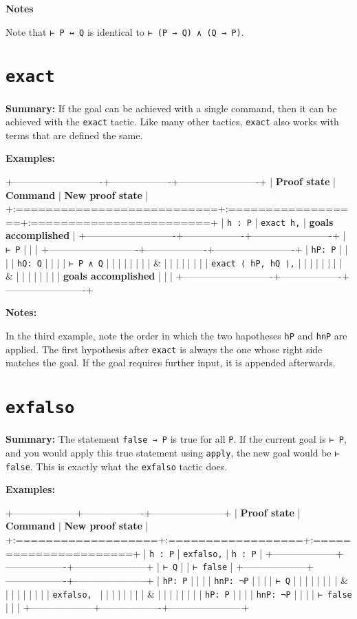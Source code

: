 \documentclass{memoir}
\begin{document}
\textbf{Notes}

Note that \Verb|⊢ P ↔ Q| is identical to \Verb|⊢ (P → Q) ∧ (Q → P)|.




\section{\Verb|exact|}

\textbf{Summary:} If the goal can be achieved with a single command, then it can be achieved with the \Verb|exact| tactic. Like many other tactics, \Verb|exact| also works with terms that are defined the same.

\textbf{Examples:}

+----------------------------+-------------------+-------------------------+
| \textbf{Proof state} | \textbf{Command} | \textbf{New proof state} |
+:===========================+:==================+:========================+
| \Verb|h : P| | \Verb|exact h,| | \textbf{goals accomplished} |
+----------------------------+-------------------+-------------------------+
| \Verb|⊢ P| | | |
+----------------------------+-------------------+-------------------------+
| \Verb|hP: P| | | |
| \Verb|hQ: Q| | | |
| \Verb|⊢ P ∧ Q| | | |
| | | |
| & | | |
| | | |
| \Verb|exact ⟨ hP, hQ ⟩,| | | |
| | | |
| & | | |
| | | |
| \textbf{goals accomplished} | | |
+----------------------------+-------------------+-------------------------+

\textbf{Notes:}

In the third example, note the order in which the two hapotheses \Verb|hP| and \Verb|hnP| are applied. The first hypothesis after \Verb|exact| is always the one whose right side matches the goal. If the goal requires further input, it is appended afterwards.




\section{\Verb|exfalso|}

\textbf{Summary:} The statement \Verb|false → P| is true for all \Verb|P|. If the current goal is \Verb|⊢ P|, and you would apply this true statement using \Verb|apply|, the new goal would be \Verb|⊢ false|. This is exactly what the \Verb|exfalso| tactic does.

\textbf{Examples:}

+--------------------+-------------------+-----------------------+
| \textbf{Proof state} | \textbf{Command} | \textbf{New proof state} |
+:===================+:==================+:======================+
| \Verb|h : P| | \Verb|exfalso,| | \Verb|h : P| |
+--------------------+-------------------+-----------------------+
| \Verb|⊢ Q| | | \Verb|⊢ false| |
+--------------------+-------------------+-----------------------+
| \Verb|hP: P| | | |
| \Verb|hnP: ¬P| | | |
| \Verb|⊢ Q| | | |
| | | |
| & | | |
| | | |
| \Verb|exfalso, | | | |
| | | |
| & | | |
| | | |
| \Verb|hP: P| | | |
| \Verb|hnP: ¬P| | | |
| \Verb|⊢ false| | | |
+--------------------+-------------------+-----------------------+
\end{document}
